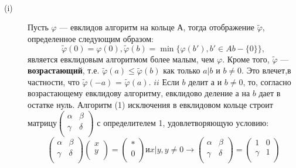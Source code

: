 \begin{lemma}
\
 \begin{description} \item[(i)]  Пусть $\varphi$ — евклидов алгоритм на кольце $А$, тогда отображение \linebreak $\tilde{\varphi}$, определенное следующим образом:
$${\tilde{\varphi}}(0)=\varphi(0), \tilde{\varphi}(b)= \min\{ \varphi(b'), b' \in Ab - \{0\} \},$$
является евклидовым алгоритмом более малым, чем $\varphi$. Кроме того, $\tilde{\varphi}$ \linebreak --- \textbf{возрастающий}, т.е. ${\tilde{\varphi}}(a) \le  {\tilde{\varphi}} (b)$ как только $ a | b $ и $ b \ne 0 $. Это влечет,\linebreak в частности, что ${\tilde{\varphi}} (-a)$ = ${\tilde{\varphi}} (a)$.
$ii$ Если $b$ делит $а$ и $b \ne 0$, то, согласно возрастающему евклидову \linebreak алгоритму, евклидово деление $а$ на $b$ дает в остатке нуль.  
Алгоритм (1) исключения в евклидовом кольце строит матрицу\linebreak ${\left( \begin{array}{ccc}
\alpha & \beta \\
\gamma & \delta \\
\end{array} \right)}$ с определителем 1, удовлетворяющую условию:
$${\left( \begin{array}{ccc}
\alpha & \beta \\
\gamma & \delta \\
\end{array} \right)}{\left( \begin{array}{ccc}
x \\
y \\
\end{array} \right)}={\left( \begin{array}{ccc}
*\\
0 \\
\end{array} \right)} и  x|y, y \ne 0 \longrightarrow {\left( \begin{array}{ccc}
\alpha & \beta \\
\gamma & \delta \\
\end{array} \right)}={\left( \begin{array}{ccc}
1 & 0\\
\gamma & 1 \\
\end{array} \right)}$$
\end{description}
\end{lemma}
